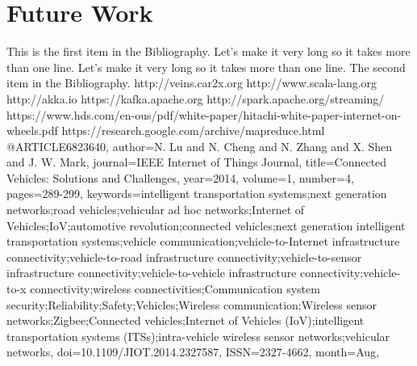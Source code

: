\documentclass{thesis}
\begin{document}
\section{Future Work}


\begin{singlespace}
\begin{thebibliography}{99}
 This is the first item in the Bibliography.
Let's make it very long so it takes more than one line.
Let's make it very long so it takes more than one line.
 The second item in the Bibliography.
    http://veins.car2x.org %
    http://www.scala-lang.org %
    http://akka.io %
    https://kafka.apache.org %
    http://spark.apache.org/streaming/ %
    https://www.hds.com/en-ous/pdf/white-paper/hitachi-white-paper-internet-on-wheels.pdf
    https://research.google.com/archive/mapreduce.html
    @ARTICLE{6823640, 
        author={N. Lu and N. Cheng and N. Zhang and X. Shen and J. W. Mark}, 
        journal={IEEE Internet of Things Journal}, 
        title={Connected Vehicles: Solutions and Challenges}, 
        year={2014}, 
        volume={1}, 
        number={4}, 
        pages={289-299}, 
        keywords={intelligent transportation systems;next generation networks;road vehicles;vehicular ad hoc networks;Internet of Vehicles;IoV;automotive revolution;connected vehicles;next generation intelligent transportation systems;vehicle communication;vehicle-to-Internet infrastructure connectivity;vehicle-to-road infrastructure connectivity;vehicle-to-sensor infrastructure connectivity;vehicle-to-vehicle infrastructure connectivity;vehicle-to-x connectivity;wireless
        connectivities;Communication system security;Reliability;Safety;Vehicles;Wireless communication;Wireless sensor networks;Zigbee;Connected vehicles;Internet of Vehicles (IoV);intelligent transportation systems (ITSs);intra-vehicle wireless sensor networks;vehicular networks}, 
        doi={10.1109/JIOT.2014.2327587}, 
        ISSN={2327-4662}, 
        month={Aug},}

\end{thebibliography}
\end{singlespace}
\end{document}
